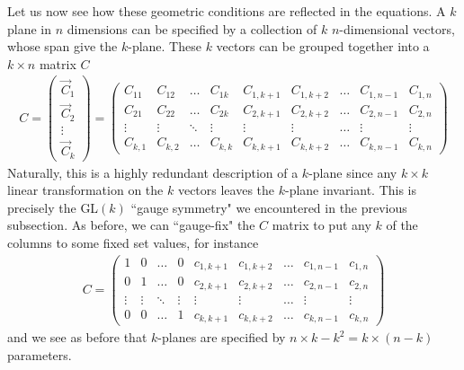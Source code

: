 \documentclass[12pt]{article}
\newcommand{\be}{\begin{eqnarray}}
\newcommand{\ee}{\end{eqnarray}}
\begin{document}
Let us now see how these geometric conditions are reflected in the equations. A $k$ plane in $n$ dimensions can be specified by a collection of $k$ $n$-dimensional vectors, whose span give the $k$-plane. These $k$ vectors can be grouped together into a $k \times n$ matrix $C$
\be
C = \left(\begin{array}{c} \vec{C}_1 \\ \vec{C}_2 \\ \vdots \\ \vec{C}_k \end{array} \right) =
\left(\begin{array}{ccccccccc} C_{11} & C_{12}  & \ldots & C_{1k} & C_{1,k+1} & C_{1,k+2} & \ldots & C_{1,n-1} & C_{1,n} \\ C_{21} & C_{22} & \ldots & C_{2k} & C_{2,k+1} & C_{2,k+2} & \ldots & C_{2,n-1} & C_{2,n} \\ \vdots & \vdots &  \ddots & \vdots & \vdots & \vdots & \ldots & \vdots & \vdots \\ C_{k,1} & C_{k,2} & \ldots & C_{k,k} & C_{k,k+1} & C_{k,k+2} & \ldots & C_{k,n-1} & C_{k,n} \end{array} \right)
\ee
Naturally, this is a highly redundant description of a $k$-plane since any $k \times k$ linear transformation on the $k$ vectors leaves the $k$-plane invariant. This is precisely the GL$(k)$ ``gauge symmetry" we encountered in the previous subsection. As before, we can ``gauge-fix" the $C$ matrix to put any $k$ of the columns to some fixed set values, for instance
\be
\label{choice}
C = \left(\begin{array}{ccccccccc} 1 & 0  & \ldots & 0 & c_{1,k+1} & c_{1,k+2} & \ldots & c_{1,n-1} & c_{1,n} \\ 0 & 1 & \ldots & 0 & c_{2,k+1} & c_{2,k+2} & \ldots & c_{2,n-1} & c_{2,n} \\ \vdots & \vdots &  \ddots & \vdots & \vdots & \vdots & \ldots & \vdots & \vdots \\ 0 & 0 & \ldots & 1 & c_{k,k+1} & c_{k,k+2} & \ldots & c_{k,n-1} & c_{k,n} \end{array} \right)
\ee
and we see as before that $k$-planes are specified by $n \times k - k^2 = k \times (n-k)$ parameters.
\end{document}
